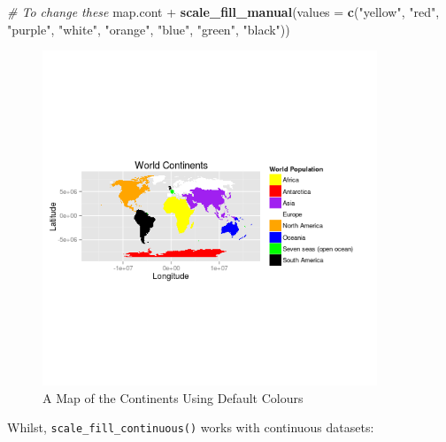 \documentclass[]{article}
\newenvironment{Shaded}{}{}
\newcommand{\KeywordTok}[1]{\textcolor[rgb]{0.00,0.44,0.13}{\textbf{{#1}}}}
\newcommand{\DataTypeTok}[1]{\textcolor[rgb]{0.56,0.13,0.00}{{#1}}}
\newcommand{\StringTok}[1]{\textcolor[rgb]{0.25,0.44,0.63}{{#1}}}
\newcommand{\CommentTok}[1]{\textcolor[rgb]{0.38,0.63,0.69}{\textit{{#1}}}}
\newcommand{\NormalTok}[1]{{#1}}
\let\Oldincludegraphics\includegraphics
\renewcommand{\includegraphics}[1]{\Oldincludegraphics[width=10cm]{#1}}
\begin{document}
\begin{Shaded}
\begin{Highlighting}[]

\CommentTok{# To change these}
\NormalTok{map.cont + }\KeywordTok{scale_fill_manual}\NormalTok{(}\DataTypeTok{values =} \KeywordTok{c}\NormalTok{(}\StringTok{"yellow"}\NormalTok{, }\StringTok{"red"}\NormalTok{, }\StringTok{"purple"}\NormalTok{, }\StringTok{"white"}\NormalTok{, }
    \StringTok{"orange"}\NormalTok{, }\StringTok{"blue"}\NormalTok{, }\StringTok{"green"}\NormalTok{, }\StringTok{"black"}\NormalTok{))}
\end{Highlighting}
\end{Shaded}
\begin{figure}[htbp]
\centering
\includegraphics{figure/A_Map_of_the_Continents_Using_Default_Colours2.png}
\caption{A Map of the Continents Using Default Colours}
\end{figure}

Whilst, \texttt{scale\_fill\_continuous()} works with continuous
datasets:
\end{document}
